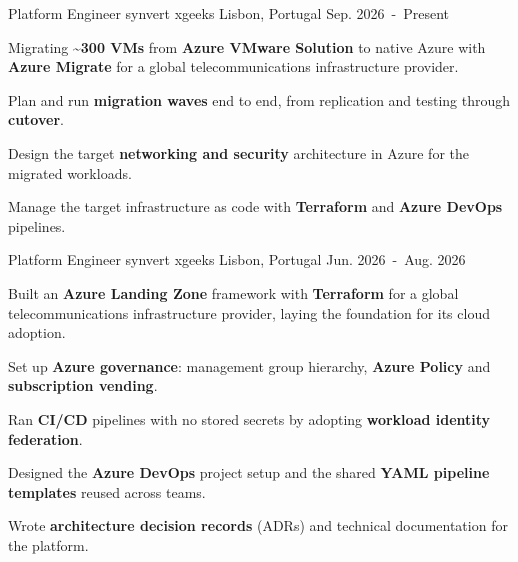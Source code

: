 \begin{cventries}
\nopagebreak


\cventry
  {Platform Engineer} %
  {synvert xgeeks} %
  {Lisbon, Portugal} %
  {Sep. 2026~-~Present} %
  {
    \begin{cvitems}
      \item {Migrating \textbf{\textasciitilde{}300 VMs} from \textbf{Azure VMware Solution} to native Azure with \textbf{Azure Migrate} for a global telecommunications infrastructure provider.}
      \item {Plan and run \textbf{migration waves} end to end, from replication and testing through \textbf{cutover}.}
      \item {Design the target \textbf{networking and security} architecture in Azure for the migrated workloads.}
      \item {Manage the target infrastructure as code with \textbf{Terraform} and \textbf{Azure DevOps} pipelines.}
    \end{cvitems}
  }


\cventry
  {Platform Engineer} %
  {synvert xgeeks} %
  {Lisbon, Portugal} %
  {Jun. 2026~-~Aug. 2026} %
  {
    \begin{cvitems}
      \item {Built an \textbf{Azure Landing Zone} framework with \textbf{Terraform} for a global telecommunications infrastructure provider, laying the foundation for its cloud adoption.}
      \item {Set up \textbf{Azure governance}: management group hierarchy, \textbf{Azure Policy} and \textbf{subscription vending}.}
      \item {Ran \textbf{CI/CD} pipelines with no stored secrets by adopting \textbf{workload identity federation}.}
      \item {Designed the \textbf{Azure DevOps} project setup and the shared \textbf{YAML pipeline templates} reused across teams.}
      \item {Wrote \textbf{architecture decision records} (ADRs) and technical documentation for the platform.}
    \end{cvitems}
  }


\end{cventries}
